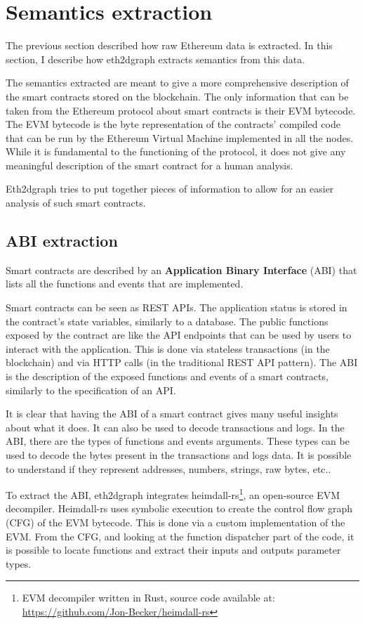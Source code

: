 \section{Semantics extraction}

The previous section described how raw Ethereum data is extracted. In this section, I describe how eth2dgraph extracts semantics from this data.

The semantics extracted are meant to give a more comprehensive description of the smart contracts stored on the blockchain. The only information that can be taken from the Ethereum protocol about smart contracts is their EVM bytecode. The EVM bytecode is the byte representation of the contracts' compiled code that can be run by the Ethereum Virtual Machine implemented in all the nodes. While it is fundamental to the functioning of the protocol, it does not give any meaningful description of the smart contract for a human analysis. 

Eth2dgraph tries to put together pieces of information to allow for an easier analysis of such smart contracts.

\subsection{ABI extraction}

\label{decompilation-section}
Smart contracts are described by an \textbf{Application Binary Interface} (ABI) that lists all the functions and events that are implemented. 

Smart contracts can be seen as REST APIs. The application status is stored in the contract's state variables, similarly to a database.
The public functions exposed by the contract are like the API endpoints that can be used by users to interact with the application. This is done via stateless transactions (in the blockchain) and via HTTP calls (in the traditional REST API pattern). The ABI is the description of the exposed functions and events of a smart contracts, similarly to the specification of an API. 

It is clear that having the ABI of a smart contract gives many useful insights about what it does. It can also be used to decode transactions and logs. In the ABI, there are the types of functions and events arguments. These types can be used to decode the bytes present in the transactions and logs data. It is possible to understand if they represent addresses, numbers, strings, raw bytes, etc..

To extract the ABI, eth2dgraph integrates heimdall-rs\footnote{EVM decompiler written in Rust, source code available at: \url{https://github.com/Jon-Becker/heimdall-rs}}, an open-source EVM decompiler. Heimdall-rs uses symbolic execution to create the control flow graph (CFG) of the EVM bytecode. This is done via a custom implementation of the EVM. From the CFG, and looking at the function dispatcher part of the code, it is possible to locate functions and extract their inputs and outputs parameter types.

